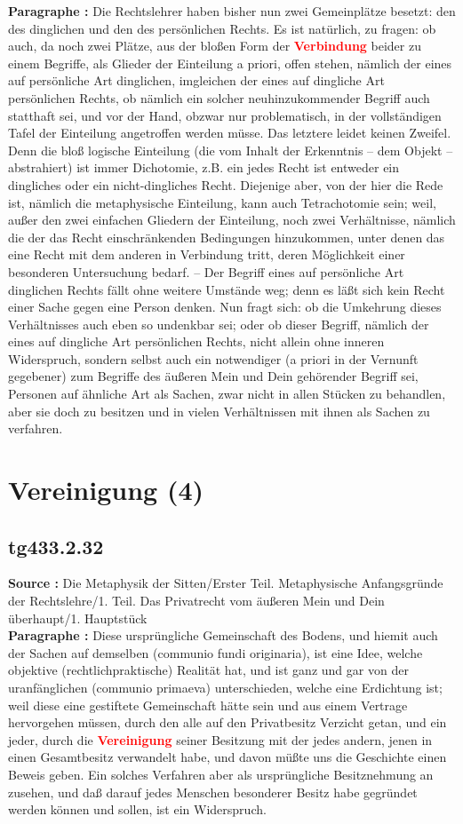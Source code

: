 \documentclass[a4paper,12pt,twoside]{book}
\newcommand{\match}[1]{\textcolor{red}{\textbf{#1}}}
\newcommand{\unnumberedsection}[1]{
	\section*{#1}
	\addcontentsline{toc}{section}{#1}
	\markright{#1}
}
\begin{document}
	\textbf{Paragraphe : }Die Rechtslehrer haben bisher nun zwei Gemeinplätze besetzt: den des dinglichen und den des persönlichen Rechts. Es ist natürlich, zu fragen: ob auch, da noch zwei Plätze, aus der bloßen Form der \match{Verbindung} beider zu einem Begriffe, als Glieder der Einteilung a priori, offen stehen, nämlich der eines auf persönliche Art dinglichen, imgleichen der eines auf dingliche Art persönlichen Rechts, ob nämlich ein solcher neuhinzukommender Begriff auch statthaft sei, und vor der Hand, obzwar nur problematisch, in der vollständigen Tafel der Einteilung angetroffen werden müsse. Das letztere leidet keinen Zweifel. Denn die bloß logische Einteilung (die vom Inhalt der Erkenntnis – dem Objekt – abstrahiert) ist immer Dichotomie, z.B. ein jedes Recht ist entweder ein dingliches oder ein nicht-dingliches Recht. Diejenige aber, von der hier die Rede ist, nämlich die metaphysische Einteilung, kann auch Tetrachotomie sein; weil, außer den zwei einfachen Gliedern  der Einteilung, noch zwei Verhältnisse, nämlich die der das Recht einschränkenden Bedingungen hinzukommen, unter denen das eine Recht mit dem anderen in Verbindung tritt, deren Möglichkeit einer besonderen Untersuchung bedarf. – Der Begriff eines auf persönliche Art dinglichen Rechts fällt ohne weitere Umstände weg; denn es läßt sich kein Recht einer Sache gegen eine Person denken. Nun fragt sich: ob die Umkehrung dieses Verhältnisses auch eben so undenkbar sei; oder ob dieser Begriff, nämlich der eines auf dingliche Art persönlichen Rechts, nicht allein ohne inneren Widerspruch, sondern selbst auch ein notwendiger (a priori in der Vernunft gegebener) zum Begriffe des äußeren Mein und Dein gehörender Begriff sei, Personen auf ähnliche Art als Sachen, zwar nicht in allen Stücken zu behandlen, aber sie doch zu besitzen und in vielen Verhältnissen mit ihnen als Sachen zu verfahren. 
	
	\unnumberedsection{Vereinigung (4)} 
	\subsection*{tg433.2.32} 
	\textbf{Source : }Die Metaphysik der Sitten/Erster Teil. Metaphysische Anfangsgründe der Rechtslehre/1. Teil. Das Privatrecht vom äußeren Mein und Dein überhaupt/1. Hauptstück\\  
	
	\textbf{Paragraphe : }Diese ursprüngliche Gemeinschaft des Bodens, und hiemit auch der Sachen auf demselben (communio fundi originaria), ist eine Idee, welche objektive (rechtlichpraktische) Realität hat, und ist ganz und gar von der uranfänglichen (communio primaeva) unterschieden,  welche eine Erdichtung ist; weil diese eine gestiftete Gemeinschaft hätte sein und aus einem Vertrage hervorgehen müssen, durch den alle auf den Privatbesitz Verzicht getan, und ein jeder, durch die \match{Vereinigung} seiner Besitzung mit der jedes andern, jenen in einen Gesamtbesitz verwandelt habe, und davon müßte uns die Geschichte einen Beweis geben. Ein solches Verfahren aber als ursprüngliche Besitznehmung an zusehen, und daß darauf jedes Menschen besonderer Besitz habe gegründet werden können und sollen, ist ein Widerspruch. 
	
\end{document}
